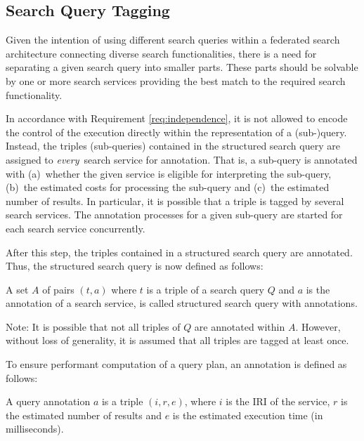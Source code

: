 \subsection{Search Query Tagging}
Given the intention of using different search queries within a federated search architecture connecting diverse search functionalities, there is a need for separating a given search query into smaller parts.
These parts should be solvable by one or more search services providing the best match to the required search functionality.

In accordance with Requirement \ref{req:independence}, it is not allowed to encode the control of the execution directly within the representation of a (sub-)query.
Instead, the triples (\ie sub-queries) contained in the structured search query are assigned to \emph{every}\ search service for annotation.
That is, a sub-query is annotated with (a)~whether the given service is eligible for interpreting the sub-query, (b)~the estimated costs for processing the sub-query and (c)~the estimated number of results. 
In particular, it is possible that a triple is tagged by several search services.
The annotation processes for a given sub-query are started for each search service concurrently.

After this step, the triples contained in a structured search query are annotated. 
Thus, the structured search query is now defined as follows:
\begin{definition}%
A set $A$ of pairs $(t,a)$ where $t$ is a triple of a search query $Q$ and $a$ is the annotation of a search service, is called structured search query with annotations. 
\end{definition} 
Note: It is possible that not all triples of $Q$ are annotated within $A$.
However, without loss of generality, it is assumed that all triples are tagged at least once.

To ensure performant computation of a query plan, an annotation is defined as follows:
\begin{definition}
A query annotation $a$ is a triple $(i,r,e)$, where $i$ is the IRI of the service, $r$ is the estimated number of results and $e$ is the estimated execution time (in milliseconds).
\end{definition}


